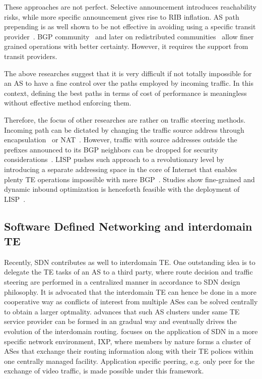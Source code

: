 These approaches are not perfect. Selective announcement introduces reachability risks, while more specific announcement gives rise to \ac{RIB} inflation. AS path prepending is as well shown to be not effective in avoiding using a specific transit provider~\cite{Quoitin2004a}. BGP community~\cite{Donnet2008, Shao2015} and later on redistributed communities~\cite{Quoitin2002} allow finer grained operations with better certainty. However, it requires the support from transit providers. 

The above researches suggest that it is very difficult if not totally impossible for an AS to have a fine control over the paths employed by incoming traffic. In this context, defining the best paths in terms of cost of performance is meaningless without effective method enforcing them. 

Therefore, the focus of other researches are rather on traffic steering methods.
Incoming path can be dictated by changing the traffic source address through encapsulation~\cite{Liu2008} or \ac{NAT}~\cite{Sun2015}. However, traffic with source addresses outside the prefixes announced to its BGP neighbors can be dropped for security considerations~\cite{filtering}.
\ac{LISP} pushes such approach to a revolutionary level by introducing a separate addressing space in the core of Internet that enables plenty TE operations impossible with mere BGP~\cite{lisp}. Studies show fine-grained and dynamic inbound optimization is henceforth feasible with the deployment of \ac{LISP}~\cite{Iannone2007, saucez2011mechanisms, quoitin2007evaluating}.

\subsection{Software Defined Networking and interdomain TE}
Recently, \acf{SDN} contributes as well to interdomain TE. One outstanding idea is to delegate the TE tasks of an AS to a third party, where route decision and traffic steering are performed in a centralized manner in accordance to \ac{SDN} design philosophy. It is advocated that the interdomain TE can hence be done in a more cooperative way as conflicts of interest from multiple ASes can be solved centrally to obtain a larger optmality.
\citet{Kotronis2012} advances that such AS clusters under same TE service provider can be formed in an gradual way and eventually drives the evolution of the interdomain routing.
\citet{Gupta2014} focuses on the application of \ac{SDN} in a more specific network environment, \ac{IXP}, where members by nature forms a cluster of ASes that exchange their routing information along with their TE polices within one centrally managed facility. Application specific peering, e.g. only peer for the exchange of video traffic, is made possible under this framework.

